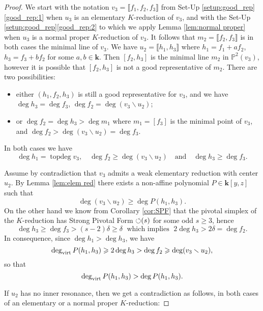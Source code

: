 \documentclass[reqno,oneside,11pt]{amsart}
\theoremstyle{plain}
\theoremstyle{definition}
\newcommand{\p}{\mathbb{P}}
\newcommand{\K}{\mathbf{k}}
\DeclareMathOperator{\topdeg}{topdeg}
\newcommand{\PF}{\text{$\circlearrowleft$\!\,}}
\newcommand{\dvirt}{\deg_{\text{\rm virt}}}
\newcommand{\llb}{\llbracket}
\newcommand{\rrb}{\rrbracket}
\newcommand{\lines}[1]{\p^2(#1)}
\renewcommand{\ge}{\geqslant}
\begin{document}
\begin{proof}
We start with the notation $v_3 = \llb f_1, f_2, f_3 \rrb$ from Set-Up \ref{setup:good_rep}\ref{good_rep:1} when $u_3$ is an elementary $K$-reduction of $v_3$,
and with the Set-Up \ref{setup:good_rep}\ref{good_rep:2} to which we apply Lemma \ref{lem:normal proper} when $u_3$ is a normal proper $K$-reduction of $v_3$.
It follows that $m_2 = \llb f_2, f_3 \rrb$ is in both cases the minimal line of $v_3$. 
We have $u_2 = \llb h_1, h_3 \rrb$ where $h_1 = f_1 + af_2$, $h_3 = f_3 + bf_2$ for some $a, b \in \K$.
Then $[f_2, h_3]$ is the minimal line $m_2$ in $\lines{v_3}$, however it is possible that $[f_2, h_3]$ is not a good representative of $m_2$.
There are two possibilities:

\begin{itemize}[wide]
\item either $(h_1,f_2,h_3)$ is still a good representative for $v_3$, and we have $\deg h_3 = \deg f_3$, $\deg f_2 = \deg (v_3 \smallsetminus u_2)$;
\item or $\deg f_2 = \deg h_3 > \deg m_1$ where $m_1 = [f_3]$ is the minimal point of $v_3$, and $\deg f_2 > \deg (v_3 \smallsetminus u_2) = \deg f_3$.
\end{itemize}
In both cases we have
\begin{equation*} \label{eq:the true equation}
\deg h_1 = \topdeg v_3, \quad \deg f_2 \ge \deg (v_3 \smallsetminus u_2) \quad \text{and} \quad \deg h_3 \ge \deg f_3.
\end{equation*}

Assume by contradiction that $v_3$ admits a weak elementary reduction with center $u_2$.
By Lemma \ref{lem:elem red} there exists a non-affine polynomial $P\in
\K[y,z]$
such that
$$\deg (v_3 \smallsetminus u_2)\ge \deg P(h_1,h_3).$$
On the other hand we know from Corollary \ref{cor:SPF} that the pivotal simplex
of the $K$-reduction has Strong Pivotal Form $\PF(s)$ for some odd $s \ge 3$, hence
$$\deg h_3 \ge \deg f_3 > (s-2)\delta \ge \delta \;\text{ which implies }\;
2\deg h_3 > 2\delta =  \deg f_2.$$
In consequence, since $\deg h_1 > \deg h_3$, we have 
$$\dvirt P(h_1,h_3) \ge 2\deg h_3 > \deg f_2 \ge \deg (v_3 \smallsetminus u_2),$$ so that
$$\dvirt P(h_1,h_3) > \deg P(h_1,h_3).$$

If $u_2$ has no inner resonance, then we get a contradiction as follows, in both cases of an elementary or a normal proper $K$-reduction:



\end{proof}
\end{document}
